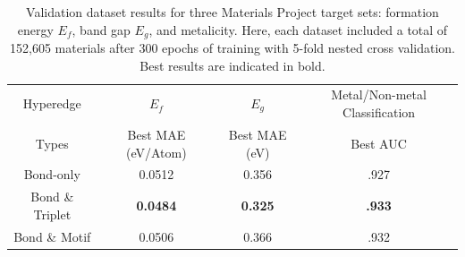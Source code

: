 \documentclass[10pt,a4paper,twocolumn]{article}
\begin{document}
\begin{table}
	\begin{tabular*}{\textwidth}{@{\extracolsep{\fill}}cccc}
		\hline
		Hyperedge & $E_f$ & $E_g$ & Metal/Non-metal Classification \\
		Types & Best MAE (eV/Atom) & Best MAE (eV) & Best AUC \\
		\hline
		Bond-only & 0.0512 & 0.356 & .927 \\
		Bond \& Triplet &  \textbf{0.0484} & \textbf{0.325 } & \textbf{.933}\\
		Bond \& Motif &  0.0506 & 0.366 & .932\\
		\hline
	\end{tabular*}
	\caption{Validation dataset results for three Materials Project target sets: formation energy $E_f$, band gap $E_g$, and metalicity. Here, each dataset included a total of 152,605 materials after 300 epochs of training with 5-fold nested cross validation. Best results are indicated in bold.}\label{fig:mp_table}
\end{table}






\end{document}
